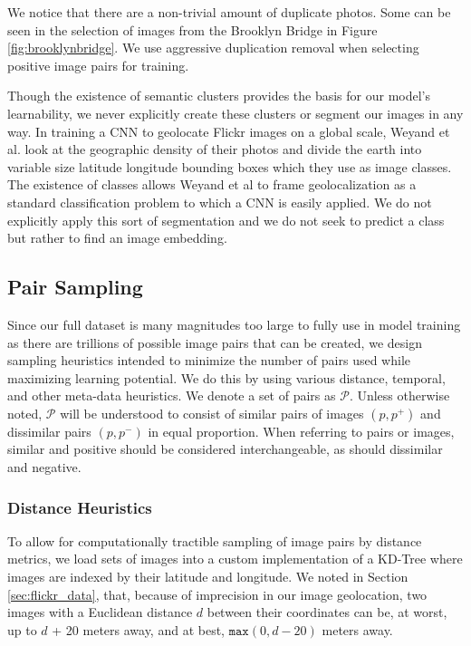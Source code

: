 We notice that there are a non-trivial amount of duplicate photos. Some can be seen in the selection of images from the Brooklyn Bridge in Figure \ref{fig:brooklynbridge}. We use aggressive duplication removal when selecting positive image pairs for training. 

Though the existence of semantic clusters provides the basis for our model's learnability, we never explicitly create these clusters or segment our images in any way. In training a CNN to geolocate Flickr images on a global scale, Weyand et al. look at the geographic density of their photos and divide the earth into variable size latitude longitude bounding boxes which they use as image classes.\cite{weyand2016planet} The existence of classes allows Weyand et al to frame geolocalization as a standard classification problem to which a CNN is easily applied. We do not explicitly apply this sort of segmentation and we do not seek to predict a class but rather to find an image embedding.

\subsection{Pair Sampling}\label{sec:pair_sampling}
Since our full dataset is many magnitudes too large to fully use in model training as there are trillions of possible image pairs that can be created, we design sampling heuristics intended to minimize the number of pairs used while maximizing learning potential. We do this by using various distance, temporal, and other meta-data heuristics. We denote a set of pairs as $\mathcal{P}$. Unless otherwise noted, $\mathcal{P}$ will be understood to consist of similar pairs of images $(p, p^+)$ and dissimilar pairs $(p, p^-)$ in equal proportion. When referring to pairs or images, similar and positive should be considered interchangeable, as should dissimilar and negative. 

\subsubsection{Distance Heuristics}
To allow for computationally tractible sampling of image pairs by distance metrics, we load sets of images into a custom implementation of a KD-Tree where images are indexed by their latitude and longitude. We noted in Section \ref{sec:flickr_data}, that, because of imprecision in our image geolocation, two images with a Euclidean distance $d$ between their coordinates can be, at worst, up to $d$ + 20 meters away, and at best, $\texttt{max}(0, d-20)$ meters away.

